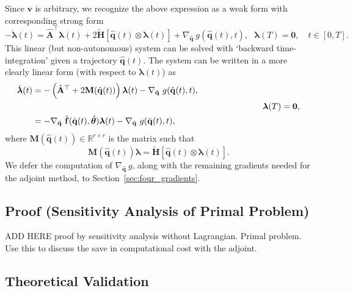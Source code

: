 Since $\mathbf{v}$ is arbitrary, we recognize the above expression as a weak form with corresponding strong form\\
\begin{equation*}
    -\dot{\bm{\lambda}}(t) = \hat{\mathbf{A}}^{\top} \bm{\lambda}(t) + 2\tilde{\mathbf{H}}[\hat{\mathbf{q}}(t)\otimes \bm{\lambda}(t)] + \nabla_{\hat{\mathbf{q}}}~g(\hat{\mathbf{q}}(t),t),~~~\bm{\lambda}(T)=\bm{0},\quad t\in [0,T].
\end{equation*}
This linear (but non-autonomous) system can be solved with `backward time-integration' given a trajectory $\hat{\mathbf{q}}(t)$. The system can be written in a more clearly linear form (with respect to $\bm{\lambda}(t)$) as\\
\begin{align}
    \label{eq:gradient_fq}
     \dot{\bm{\lambda}}(t) &= -\left(\hat{\mathbf{A}}^{\top} + 2\mathbf{M}(\hat{\mathbf{q}}(t))\right)\bm{\lambda}(t) - \nabla_{\hat{\mathbf{q}}}~g(\hat{\mathbf{q}}(t),t),\notag\\
    &~\hspace{8.8cm}~~~~~\bm{\lambda}(T)=\bm{0},\\
    &= -\nabla_{\hat{\mathbf{q}}}~\hat{\mathbf{f}}(\hat{\mathbf{q}}(t),\hat{\bm{\theta}})\bm{\lambda}(t) - \nabla_{\hat{\mathbf{q}}}~g(\hat{\mathbf{q}}(t),t)\notag,
\end{align}
where $\mathbf{M}(\hat{\mathbf{q}}(t))\in\mathbb{R}^{r\times r}$ is the matrix such that\\
\begin{equation*}
    \mathbf{M}(\hat{\mathbf{q}}(t)) \bm{\lambda} = \tilde{\mathbf{H}}[\hat{\mathbf{q}}(t)\otimes \bm{\lambda}(t)].
\end{equation*}
We defer the computation of $\nabla_{\hat{\mathbf{q}}}~g$, along with the remaining gradients needed for the adjoint method, to Section~\ref{sec:four_gradients}.




\subsection*{Proof (Sensitivity Analysis of Primal Problem)}

ADD HERE proof by sensitivity analysis without Lagrangian. Primal problem. Use this to discuss the save in computational cost with the adjoint.


\subsection*{Theoretical Validation}

